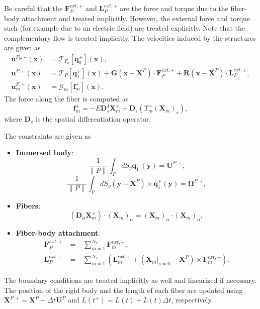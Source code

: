 \documentclass{article}
\newcommand{\OOmega}{\boldsymbol{\Omega}}
\newcommand{\uu}{\mathbf{u}}
\newcommand{\UU}{\mathbf{U}}
\newcommand{\XX}{\mathbf{X}}
\newcommand{\RR}{\mathbf{R}}
\newcommand{\xx}{\mathbf{x}}
\newcommand{\yy}{\mathbf{y}}
\newcommand{\qq}{\mathbf{q}}
\newcommand{\ff}{\mathbf{f}}
\newcommand{\FF}{\mathbf{F}}
\newcommand{\GG}{\mathbf{G}}
\newcommand{\calG}{\mathcal{G}}
\newcommand{\calT}{\mathcal{T}}
\newcommand{\LL}{\mathbf{L}}
\begin{document}
Be careful that the $\FF_P^{ext,+}$ and $\LL_P^{ext,+}$ are the force and torque due to the fiber-body attachment and treated implicitly. However, the external force and torque such (for example due to an electric field) are treated explicitly. Note that the complementary flow is treated implicitly. The velocities induced by the structures are given as
\begin{align}
    \uu^{\Gamma_0,+}(\xx) & = \calT_{\Gamma_0}[\qq_0^+](\xx),\\
    \uu^{P,+}(\xx) & = \calT_P[\qq_1^+](\xx) + \GG(\xx-\XX^P)\cdot\FF^{ext,+}_P + \RR(\xx-\XX^P)\cdot\LL^{ext,+}_P,\\
    \uu^{F,+}_m(\xx) &= \calG_m[\ff^+_m](\xx).
\end{align}
The force along the fiber is computed as
\begin{equation}
    \ff_m^+ = -E\mathbf{D}_s^4\XX_m^+ + \mathbf{D}_s\left(T_m^+(\XX_m)_s\right),
\end{equation}
where $\mathbf{D}_s$ is the spatial differentiation operator.

The constraints are given as
\begin{itemize}
    \item \textbf{Immersed body}:
    \begin{equation}
      \frac{1}{\|P\|}\int_P dS_y \qq_1^+(\yy) = \UU^{P,+},
    \end{equation}
    \begin{equation}
      \frac{1}{\|P\|}\int_P dS_y (\yy-\XX^P) \times \qq_1^+(\yy) = \OOmega^{P,+},
    \end{equation}
    \item \textbf{Fibers}:
    \begin{equation}
        \left(\mathbf{D}_{\alpha}\XX_m^+\right)\cdot(\XX_m)_{\alpha} = (\XX_m)_{\alpha} \cdot (\XX_m)_{\alpha},
    \end{equation}
    \item \textbf{Fiber-body attachment}:
    \begin{align}
        \FF^{ext,+}_P & = -\sum_{m = 1}^{N_F} \FF_m^{ext,+},\\
        \LL^{ext,+}_P & = - \sum_{m = 1}^{N_F} \left(\LL_m^{ext,+} + (\XX_m|_{s=0} - \XX^P)\times \FF_m^{ext, +} \right).
    \end{align}
\end{itemize}

The boundary conditions are treated implicitly as well and linearized if necessary. The position of the rigid body and the length of each fiber are updated using $\XX^{P,+} = \XX^P + \Delta t \UU^P$ and $L(t^+) = L(t) + \dot{L}(t)\Delta t$, respectively.
\end{document}
